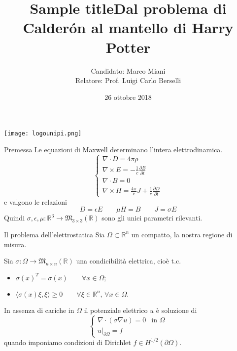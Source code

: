 \documentclass{beamer}
\title{Sample title}
\author[Marco Miani]{Candidato: Marco Miani\\ Relatore: Prof. Luigi Carlo Berselli}
\institute{Università di Pisa}
\date{26 ottobre 2018}
\title[Dal problema di Calder\'on al mantello di Harry Potter] %
{Dal problema di Calder\'on al mantello di Harry Potter}
\newcommand{\bbR}{\mathbb{R}}
\newcommand{\de}{\partial}
\newcommand{\1}{\mathbbm{1}}
\begin{document}
 
\begin{frame}[plain]
	\centering\texttt{[image: logounipi.png]}
	\maketitle
\end{frame}


\begin{frame}{Premessa}
Le equazioni di Maxwell determinano l'intera elettrodinamica.
\[
\left\{\begin{array}{l}
         \nabla\cdot D = 4\pi\rho \\
         \nabla \times E = - \frac{1}{c}\frac{\de B}{\de t} \\
         \nabla\cdot B = 0 \\
         \nabla \times H = \frac{4\pi}{c}J + \frac{1}{c}\frac{\de D}{\de t} 
    \end{array}\right.
\]
e valgono le relazioni
\[
D=\epsilon E
\qquad
\mu H=B
\qquad
J=\sigma E
\]
Quindi $\sigma,\epsilon,\mu:\bbR^3\rightarrow\mathfrak{M}_{3\times 3}(\bbR)$ sono gli unici parametri rilevanti.
\end{frame}


\begin{frame}{Il problema dell'elettrostatica}
Sia $\Omega\subset\bbR ^n$ un compatto, la nostra regione di misura.

\pause
Sia $\sigma: \Omega \rightarrow\mathfrak{M}_{n\times n}(\bbR)$ una condicibilità elettrica\pause, cioè t.c.
\begin{itemize}
\item $\sigma(x)^T=\sigma(x) \qquad \forall x\in\Omega;$
\pause
\item $\langle\sigma(x)\xi,\xi\rangle \geq 0 \qquad \forall\xi\in\bbR^n ,\, \forall x\in\Omega.$
\end{itemize}

\vspace{10pt}
\pause
In assenza di cariche in $\Omega$ il potenziale elettrico $u$ è soluzione di
\begin{equation*}
\left\{ \begin{array}{ll}
         \nabla\cdot(\sigma\nabla u)=0 & \text{in } \Omega \\
         u|_{\de\Omega}=f
    \end{array}
\right.
\end{equation*}
quando imponiamo condizioni di Dirichlet $f\in H^{1/2}(\de\Omega)$.
\end{frame}
\end{document}
